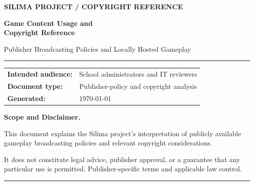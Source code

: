 

\thispagestyle{empty}
\vspace*{0.2in}

{\small\bfseries\color{documentMuted}
SILIMA PROJECT \quad / \quad COPYRIGHT REFERENCE
\par}

\vspace{0.7em}

{\fontsize{24}{29}\selectfont
\bfseries\color{documentInk}
Game Content Usage and\\[2pt]
Copyright Reference
\par}

\vspace{0.4em}

{\large\color{documentMuted}
Publisher Broadcasting Policies and
Locally Hosted Gameplay
\par}

\vspace{1.25em}

{\color{documentAccent}
\rule{\linewidth}{0.9pt}
}

\vspace{0.8em}


\begin{tabular}{@{}ll@{}}
    \textbf{Intended audience:}
        & School administrators and IT reviewers \\

    \textbf{Document type:}
        & Publisher-policy and copyright analysis \\

    \textbf{Generated:}
        & \today
\end{tabular}

\vspace{1em}


{\small
\textbf{Scope and Disclaimer.}

This document explains the Silima project's
interpretation of publicly available gameplay
broadcasting policies and relevant copyright
considerations.

It does not constitute legal advice, publisher
approval, or a guarantee that any particular
use is permitted. Publisher-specific terms
and applicable law control.
\par}

\vspace{0.8em}

{\color{documentMuted}
\rule{\linewidth}{0.35pt}
}
